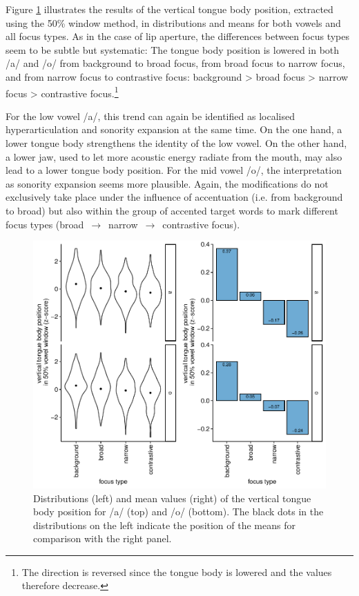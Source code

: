 Figure \ref{fig:tboy} illustrates the results of the vertical tongue body position, extracted using the 50\% window method, in distributions and means for both vowels and all focus types. As in the case of lip aperture, the differences between focus types seem to be subtle but systematic: The tongue body position is lowered in both /a/ and /o/ from background to broad focus, from broad focus to narrow focus, and from narrow focus to contrastive focus: background > broad focus > narrow focus > contrastive focus.\footnote{The direction is reversed since the tongue body is lowered and the values therefore decrease.}



For the low vowel /a/, this trend can again be identified as localised hyperarticulation and sonority expansion at the same time. On the one hand, a lower tongue body strengthens the identity of the low vowel. On the other hand, a lower jaw, used to let more acoustic energy radiate from the mouth, may also lead to a lower tongue body position. For the mid vowel /o/, the interpretation as sonority expansion seems more plausible. Again, the modifications do not exclusively take place under the influence of accentuation (i.e. from background to broad) but also within the group of accented target words to mark different focus types (broad $\,\to\,$ narrow $\,\to\,$ contrastive focus).

\begin{figure}
	\includegraphics[width=\textwidth]{figures/ch7/tboy.pdf}
	\caption[Distributions and mean values of the vertical tongue body position.]{Distributions (left) and mean values (right) of the vertical tongue body position for /a/ (top) and /o/ (bottom). The black dots in the distributions on the left indicate the position of the means for comparison with the right panel.}
	\label{fig:tboy}
\end{figure}


